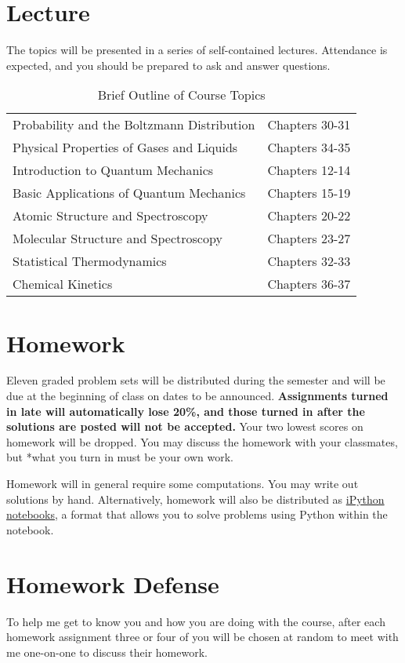 \documentclass[11pt]{article}
\begin{document}
\section{Lecture}
\label{sec:org366e927}
The topics will be presented in a series of self-contained
lectures. Attendance is expected, and you should be prepared to ask
and answer questions.  

\begin{table}[htbp]
\caption{Brief Outline of Course Topics}
\centering
\begin{tabular}{ll}
\hline
Probability and the Boltzmann Distribution & Chapters 30-31\\
Physical Properties of Gases and Liquids & Chapters 34-35\\
Introduction to Quantum Mechanics & Chapters 12-14\\
Basic Applications of Quantum Mechanics & Chapters 15-19\\
Atomic Structure and Spectroscopy & Chapters 20-22\\
Molecular Structure and Spectroscopy & Chapters 23-27\\
Statistical Thermodynamics & Chapters 32-33\\
Chemical Kinetics & Chapters 36-37\\
\hline
\end{tabular}
\end{table}

\section{Homework}
\label{sec:org39a4686}
Eleven graded problem sets will be distributed during the semester and will be due at the beginning of class on dates to be announced.  \textbf{Assignments turned in late will automatically lose 20\%, and those turned in after the solutions are posted will not be accepted.}  Your two lowest scores on homework will be dropped.  You may discuss the homework with your classmates, but *what you turn in must be your own work.

Homework will in general require some computations. You may write out solutions by hand. Alternatively, homework will also be distributed as \href{https://ipython.org/notebook.html}{iPython notebooks}, a format that allows you to solve problems using Python within the notebook.
\section{Homework Defense}
\label{sec:org810da88}
To help me get to know you and how you are doing with the course, after each homework assignment three or four of you will be chosen at random to meet with me one-on-one to discuss their homework.
\end{document}
